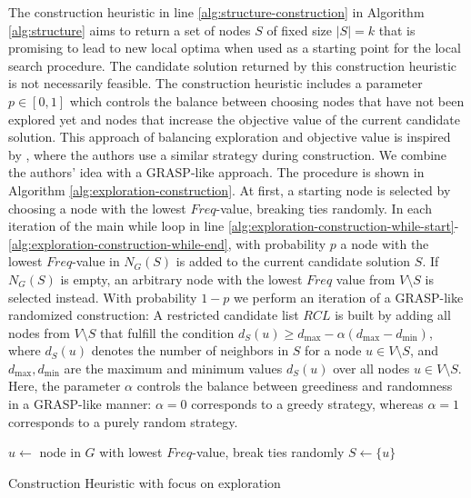 \documentclass[draft,final]{vutinfth} %
\begin{document}
The construction heuristic in line \ref{alg:structure-construction} in Algorithm \ref{alg:structure} aims to return a set of nodes $S$ of fixed size $|S| = k$ that is promising to lead to new local optima when used as a starting point for the local search procedure. The candidate solution returned by this construction heuristic is not necessarily feasible. 
The construction heuristic includes a parameter $p \in [0,1]$ which controls the balance between choosing nodes that have not been explored yet and nodes that increase the objective value of the current candidate solution. This approach of balancing exploration and objective value is inspired by \cite{chen_nuqclq_2021}, where the authors use a similar strategy during construction. We combine the authors' idea with a GRASP-like approach. The procedure is shown in Algorithm \ref{alg:exploration-construction}. 
At first, a starting node is selected by choosing a node with the lowest $Freq$-value, breaking ties randomly. In each iteration of the main while loop in line \ref{alg:exploration-construction-while-start}-\ref{alg:exploration-construction-while-end}, with probability $p$ a node with the lowest $Freq$-value in $N_G(S)$ is added to the current candidate solution $S$. If $N_G(S)$ is empty, an arbitrary node with the lowest $Freq$ value from $V\setminus S$ is selected instead. 
With probability $1-p$ we perform an iteration of a GRASP-like randomized construction: A restricted candidate list $\mathit{RCL}$ is built by adding all nodes from $V \setminus S$ that fulfill the condition $d_S(u) \geq d_{\max} - \alpha(d_{\max} - d_{\min})$, where $d_S(u)$ denotes the number of neighbors in $S$ for a node $u \in V \setminus S$, and $d_{\max}, d_{\min}$ are the maximum and minimum values $d_S(u)$ over all nodes $u\in V \setminus S$. Here, the parameter $\alpha$ controls the balance between greediness and randomness in a GRASP-like manner: $\alpha=0$ corresponds to a greedy strategy, whereas $\alpha=1$ corresponds to a purely random strategy.  

\begin{algorithm}
    \DontPrintSemicolon
    $u \gets $ node in $G$ with lowest $Freq$-value, break ties randomly \;
    $S \gets \{u\}$ \;
    \label{alg:exploration-construction-while-end}
    \caption{Construction Heuristic with focus on exploration}
    \label{alg:exploration-construction}
\end{algorithm}
\end{document}
